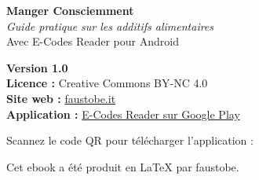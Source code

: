 \documentclass[a5paper,12pt,oneside,openany]{book}
\begin{document}
\begin{center}
\vspace{1cm}
{\large\bfseries\color{verdescuro} Manger Consciemment}\\[0.4cm]
{\itshape Guide pratique sur les additifs alimentaires}\\[0.3cm]
{\small Avec E-Codes Reader pour Android}

\vspace{1.5cm}
\textbf{Version 1.0} \quad \textbullet {}\\
\textbf{Licence :} Creative Commons BY-NC 4.0\\[0.3cm]
\textbf{Site web :} \href{https://faustobe.it}{faustobe.it}\\
\textbf{Application :} \href{https://play.google.com/store/apps/details?id=it.faustobe.ecodes}{E-Codes Reader sur Google Play}

\vspace{1.5cm}
{\small Scannez le code QR pour télécharger l'application :}\\[0.5cm]


\vspace{1cm}
{\footnotesize Cet ebook a été produit en \LaTeX{} par faustobe.}
\end{center}
\end{document}
